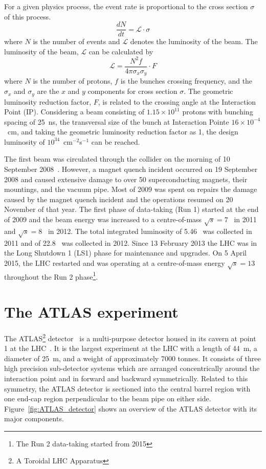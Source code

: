 For a given physics process, the event rate is proportional to the cross section $\sigma$ of this process.
\begin{equation}
\frac{dN}{dt} = \mathcal{L}\cdot\sigma
\end{equation}
where $N$ is the number of events and $\mathcal{L}$ denotes the luminosity of the beam.
The luminosity of the beam, $\mathcal{L}$ can be calculated by
\begin{equation}
\mathcal{L} = \frac{N^{2} f}{4 \pi \sigma_{x} \sigma_{y}} \cdot F
\end{equation}
where $N$ is the number of protons, $f$ is the bunches crossing frequency, and the $\sigma_{x}$ and $\sigma_{y}$ are the $x$ and $y$ components for cross section $\sigma$.
The geometric luminosity reduction factor, $F$, is related to the crossing angle at the Interaction Point (IP).
Considering a beam consisting of $1.15 \times 10^{11}$ protons with bunching spacing of 25~ns, the transversal size of the bunch at Interaction Pointe $16\times 10^{-4}$~cm, and taking the geometric luminosity reduction factor as 1, the design luminosity of $10^{34}$~cm$^{-2}$s$^{-1}$ can be reached.

The first beam was circulated through the collider on the morning of 10 September 2008~\cite{CERN-COURIER-Sep192008}.
However, a magnet quench incident occurred on 19 September 2008 and caused extensive damage to over 50 superconducting magnets, their mountings, and the vacuum pipe.
Most of 2009 was spent on repairs the damage caused by the magnet quench incident and the operations resumed on 20 November of that year.
The first phase of data-taking (Run 1) started at the end of 2009 and the beam energy was increased to a centre-of-mass $\sqrt{s}=7$~{\TeV} in 2011 and $\sqrt{s} = 8$~{\TeV} in 2012.
The total integrated luminosity of 5.46~{\ifb} was collected in 2011 and of 22.8~{\ifb} was collected in 2012.
Since 13 February 2013 the LHC was in the Long Shutdown 1 (LS1) phase for maintenance and upgrades.
On 5 April 2015, the LHC restarted and was operating at a centre-of-mass energy $\sqrt{s}=13$~{\TeV} throughout the Run 2 phase\footnote{The Run 2 data-taking started from 2015}.



\section{The ATLAS experiment}

The ATLAS\footnote{A Toroidal LHC Apparatus} detector~\cite{1748-0221-3-08-S08003} is a multi-purpose detector housed in its cavern at point 1 at the LHC~\cite{1748-0221-3-08-S08001}.
It is the largest experiment at the LHC with a length of 44~m, a diameter of 25~m, and a weight of approximately 7000 tonnes.
It consists of three high precision sub-detector systems which are arranged concentrically around the interaction point and in forward and backward symmetrically.
Related to this symmetry, the ATLAS detector is sectioned into the central barrel region with one end-cap region perpendicular to the beam pipe on either side.
Figure~\ref{fig:ATLAS_detector} shows an overview of the ATLAS detector with its major components.


